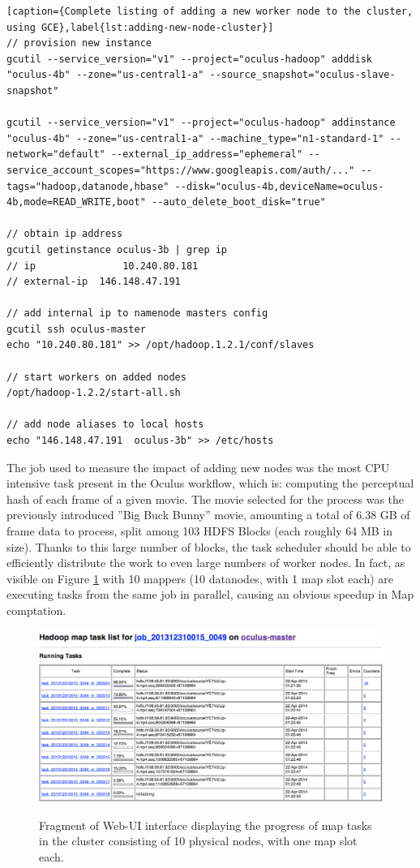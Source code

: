 \begin{lstlisting}[caption={Complete listing of adding a new worker node to the cluster, using GCE},label{lst:adding-new-node-cluster}]
// provision new instance
gcutil --service_version="v1" --project="oculus-hadoop" adddisk "oculus-4b" --zone="us-central1-a" --source_snapshot="oculus-slave-snapshot"

gcutil --service_version="v1" --project="oculus-hadoop" addinstance "oculus-4b" --zone="us-central1-a" --machine_type="n1-standard-1" --network="default" --external_ip_address="ephemeral" --service_account_scopes="https://www.googleapis.com/auth/..." --tags="hadoop,datanode,hbase" --disk="oculus-4b,deviceName=oculus-4b,mode=READ_WRITE,boot" --auto_delete_boot_disk="true"

// obtain ip address
gcutil getinstance oculus-3b | grep ip
// ip               10.240.80.181
// external-ip  146.148.47.191

// add internal ip to namenode masters config
gcutil ssh oculus-master
echo "10.240.80.181" >> /opt/hadoop.1.2.1/conf/slaves

// start workers on added nodes
/opt/hadoop-1.2.2/start-all.sh

// add node aliases to local hosts
echo "146.148.47.191  oculus-3b" >> /etc/hosts
\end{lstlisting}

The job used to measure the impact of adding new nodes was the most CPU intensive task present in the Oculus workflow, which is: computing the perceptual hash of each frame of a given movie. The movie selected for the process was the previously introduced ''Big Buck Bunny'' movie, amounting a total of 6.38 GB of frame data to process, split among 103 HDFS Blocks (each roughly 64 MB in size). Thanks to this large number of blocks, the task scheduler should be able to efficiently distribute the work to even large numbers of worker nodes. In fact, as visible on Figure \ref{fig:ten-mappers} with 10 mappers (10 datanodes, with 1 map slot each) are executing tasks from the same job in parallel, causing an obvious speedup in Map comptation.


\begin{figure}[ch!]
  \centering
  \includegraphics[width=\textwidth]{img/hadoop/10tasks-parallel}
  \label{fig:ten-mappers}
  \caption{Fragment of Web-UI interface displaying the progress of map tasks in the cluster consisting of 10 physical nodes, with one map slot each.}
\end{figure}

